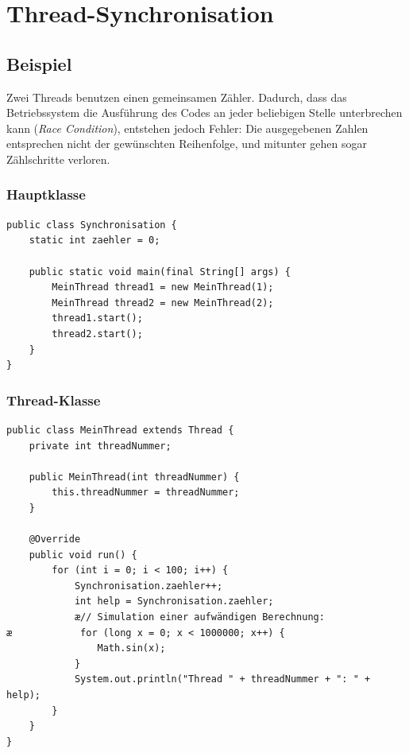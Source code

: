 \clearpage

\rehead[]{\textcolor{lightblue}{AvHG, Inf, My}}
\lohead[]{\textcolor{lightblue}{AvHG, Inf, My}}

\lstset{style=myJava}

\section{Thread-Synchronisation}

\subsection{Beispiel}

Zwei Threads benutzen einen gemeinsamen Zähler. Dadurch, dass das Betriebssystem
die Ausführung des Codes an jeder beliebigen Stelle unterbrechen kann
(\emph{Race Condition}), entstehen jedoch Fehler: Die ausgegebenen Zahlen
entsprechen nicht der gewünschten Reihenfolge, und mitunter gehen sogar
Zählschritte verloren.

\subsubsection{Hauptklasse}

\begin{lstlisting}
public class Synchronisation {
    static int zaehler = 0;
    
    public static void main(final String[] args) {
        MeinThread thread1 = new MeinThread(1);
        MeinThread thread2 = new MeinThread(2);
        thread1.start();
        thread2.start();
    }
}
\end{lstlisting}

\subsubsection{Thread-Klasse}

\begin{lstlisting}
public class MeinThread extends Thread {
    private int threadNummer;

    public MeinThread(int threadNummer) {
        this.threadNummer = threadNummer;
    }

    @Override
    public void run() {
        for (int i = 0; i < 100; i++) {
            Synchronisation.zaehler++;
            int help = Synchronisation.zaehler;
            æ// Simulation einer aufwändigen Berechnung:
æ            for (long x = 0; x < 1000000; x++) {
                Math.sin(x);
            }
            System.out.println("Thread " + threadNummer + ": " + help);
        }
    }
}
\end{lstlisting}

